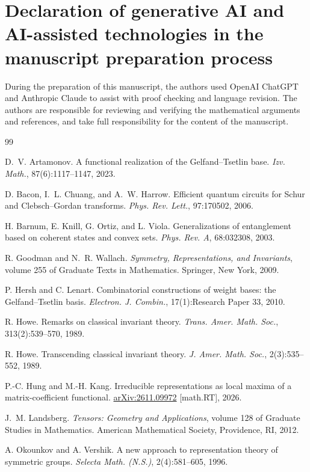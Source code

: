 \documentclass[10pt]{amsart}
\theoremstyle{remark}
\begin{document}
\section*{Declaration of generative AI and AI-assisted technologies in the manuscript preparation process}

During the preparation of this manuscript, the authors used OpenAI ChatGPT and Anthropic Claude to assist with proof checking and language revision. The authors are responsible for reviewing and verifying the mathematical arguments and references, and take full responsibility for the content of the manuscript.

\begin{thebibliography}{99}

D.~V. Artamonov.
\newblock A functional realization of the Gelfand--Tsetlin base.
\newblock \emph{Izv. Math.}, 87(6):1117--1147, 2023.

D. Bacon, I.~L. Chuang, and A.~W. Harrow.
\newblock Efficient quantum circuits for Schur and Clebsch--Gordan transforms.
\newblock \emph{Phys. Rev. Lett.}, 97:170502, 2006.

H. Barnum, E. Knill, G. Ortiz, and L. Viola.
\newblock Generalizations of entanglement based on coherent states and convex sets.
\newblock \emph{Phys. Rev. A}, 68:032308, 2003.

R. Goodman and N.~R. Wallach.
\newblock \emph{Symmetry, Representations, and Invariants}, volume 255 of Graduate Texts in Mathematics.
\newblock Springer, New York, 2009.

P. Hersh and C. Lenart.
\newblock Combinatorial constructions of weight bases: the Gelfand--Tsetlin basis.
\newblock \emph{Electron. J. Combin.}, 17(1):Research Paper 33, 2010.

R. Howe.
\newblock Remarks on classical invariant theory.
\newblock \emph{Trans. Amer. Math. Soc.}, 313(2):539--570, 1989.

R. Howe.
\newblock Transcending classical invariant theory.
\newblock \emph{J. Amer. Math. Soc.}, 2(3):535--552, 1989.

P.-C. Hung and M.-H. Kang.
\newblock Irreducible representations as local maxima of a matrix-coefficient functional.
\newblock \href{https://arxiv.org/abs/2611.09972}{arXiv:2611.09972} [math.RT], 2026.

J.~M. Landsberg.
\newblock \emph{Tensors: Geometry and Applications}, volume 128 of Graduate Studies in Mathematics.
\newblock American Mathematical Society, Providence, RI, 2012.

A. Okounkov and A. Vershik.
\newblock A new approach to representation theory of symmetric groups.
\newblock \emph{Selecta Math. (N.S.)}, 2(4):581--605, 1996.

\end{thebibliography}
\end{document}
